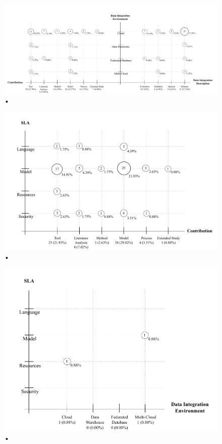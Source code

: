 \begin{figure}[hbtp]
\caption{•}
\centering
\includegraphics[scale=0.5]{figs/bubble-charts/DI-Environment-Contribution-Research.pdf}
\end{figure}

\begin{figure}[hbtp]
\caption{•}
\centering
\includegraphics[scale=0.7]{figs/bubble-charts/SLA-Contribution.pdf}
\end{figure}


\begin{figure}[hbtp]
\caption{•}
\centering
\includegraphics[scale=0.7]{figs/bubble-charts/SLA-DIEnvironment.pdf}
\end{figure}

